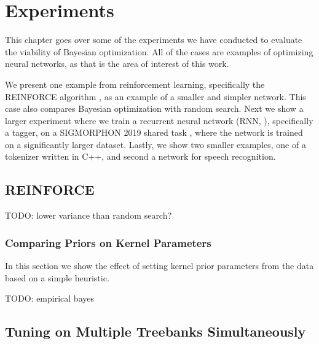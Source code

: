 \chapter{Experiments}
\label{chapter:experiments}

This chapter goes over some of the experiments we have conducted to evaluate the viability of Bayesian optimization. All of the cases are examples of optimizing neural networks, as that is the area of interest of this work.

We present one example from reinforcement learning, specifically the REINFORCE algorithm \citep{suttonbarto2018reinforcement}, as an example of a smaller and simpler network. This case also compares Bayesian optimization with random search. Next we show a larger experiment where we train a recurrent neural network (RNN, \cite{dlbook}), specifically a tagger, on a SIGMORPHON 2019 shared task \citep{sigmorphon2019task2}, where the network is trained on a significantly larger dataset. Lastly, we show two smaller examples, one of a tokenizer written in C++, and second a network for speech recognition.

\section{REINFORCE}

TODO: lower variance than random search?

\subsection{Comparing Priors on Kernel Parameters}
\label{section:experiments-empirical-bayes}

In this section we show the effect of setting kernel prior parameters from the data based on a simple heuristic.

TODO: empirical bayes


\section{Tuning on Multiple Treebanks Simultaneously}
\label{section:multiple-treebanks-failed}

